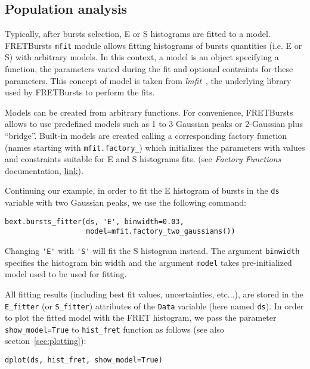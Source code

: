 \subsection{Population analysis}
\label{sec:fretfit}

Typically, after bursts selection, E or S histograms are fitted to a model.
FRETBursts \verb|mfit| module allows fitting histograms of bursts quantities
(i.e. E or S) with arbitrary models. In this context, a model is an object 
specifying a function, the parameters varied during the fit
and optional contraints for these parameters. This concept of model
is taken from \textit{lmfit}~\cite{lmfit}, the underlying library used by
FRETBursts to perform the fits.

Models can be created from arbitrary functions. For convenience,
FRETBursts allows to use predefined models such as 1 to 3 Gaussian
peaks or 2-Gaussian plus ``bridge''.
Built-in models are created calling a corresponding factory function
(names starting with \verb|mfit.factory_|) which initializes the parameters
with values and constraints suitable for E and S histograms fits.
(see \textit{Factory Functions} documentation, 
\href{http://fretbursts.readthedocs.org/en/latest/mfit.html#model-factory-functions}{link}).

Continuing our example, in order to fit the E histogram of bursts in the
\verb|ds| variable with two Gaussian peaks, we use the following command:

\begin{lstlisting}
bext.bursts_fitter(ds, 'E', binwidth=0.03,
                   model=mfit.factory_two_gaussians())
\end{lstlisting}

Changing \verb|'E'| with \verb|'S'| will fit the S histogram instead.
The argument \verb|binwidth| specifies the histogram bin width and 
the argument \verb|model| takes pre-initialized model used to be used for
fitting.

All fitting results (including best fit values, uncertainties, etc...), 
are stored in the \verb|E_fitter| (or \verb|S_fitter|)
attributes of the \verb|Data| variable (here named \verb|ds|).
In order to plot the fitted model with the FRET histogram, we pass the parameter
\verb|show_model=True| to \verb|hist_fret| function as follows
(see also section~\ref{sec:plotting}):

\begin{lstlisting}
dplot(ds, hist_fret, show_model=True)
\end{lstlisting}

